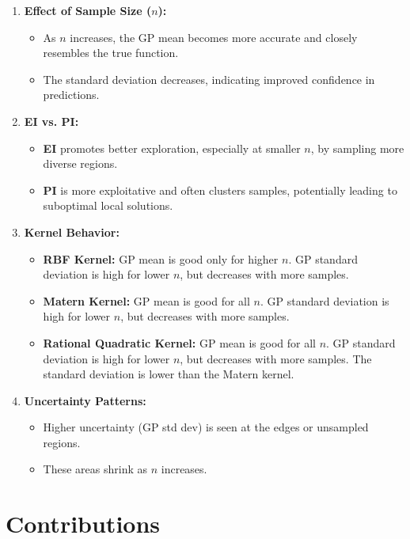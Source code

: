 \documentclass[11pt]{article}
\begin{document}
\begin{enumerate}
    \item \textbf{Effect of Sample Size ($n$):}
    \begin{itemize}
        \item As $n$ increases, the GP mean becomes more accurate and closely resembles the true function.
        \item The standard deviation decreases, indicating improved confidence in predictions.
    \end{itemize}

    \item \textbf{EI vs. PI:}
    \begin{itemize}
        \item \textbf{EI} promotes better exploration, especially at smaller $n$, by sampling more diverse regions.
        \item \textbf{PI} is more exploitative and often clusters samples, potentially leading to suboptimal local solutions.
    \end{itemize}

    \item \textbf{Kernel Behavior:}
    \begin{itemize}
        \item \textbf{RBF Kernel:} GP mean is good only for higher $n$. GP standard deviation is high for lower $n$, but decreases with more samples.
        \item \textbf{Matern Kernel:} GP mean is good for all $n$. GP standard deviation is high for lower $n$, but decreases with more samples.
        \item \textbf{Rational Quadratic Kernel:} GP mean is good for all $n$. GP standard deviation is high for lower $n$, but decreases with more samples. The standard deviation is lower than the Matern kernel.
    \end{itemize}

    \item \textbf{Uncertainty Patterns:}
    \begin{itemize}
        \item Higher uncertainty (GP std dev) is seen at the edges or unsampled regions.
        \item These areas shrink as $n$ increases.
    \end{itemize}
\end{enumerate}

\section*{Contributions}
\end{document}
